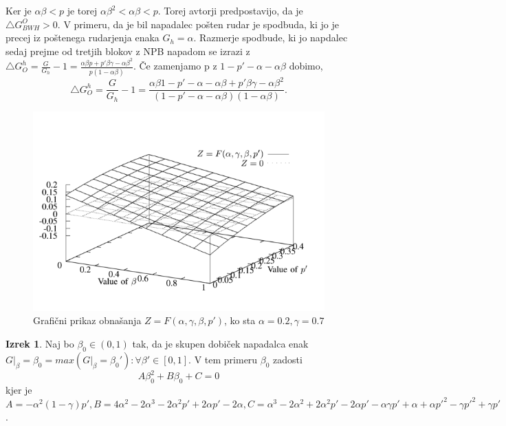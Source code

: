 \documentclass[12pt]{article}
\begin{document}
Ker je $ \alpha\beta < p $ je torej $ \alpha\beta^2 < \alpha\beta < p $. Torej avtorji predpostavijo, da je $ \bigtriangleup G_{BWH}^O > 0.$ V primeru, da je bil napadalec pošten rudar je spodbuda, ki jo je precej iz poštenega rudarjenja enaka $G_h = \alpha$. Razmerje spodbude, ki jo napdalec sedaj prejme od tretjih blokov z NPB napadom se izrazi z $\bigtriangleup G_O^h = \frac{G}{G_h} - 1 = \frac{\alpha\beta p + p' \beta\gamma - \alpha\beta^2}{p(1 - \alpha\beta)}$. Če zamenjamo p z $ 1 - p' - \alpha - \alpha\beta$ dobimo,
\begin{equation} \label{eq:4}
\bigtriangleup G_O^h = \frac{G}{G_h} - 1 = \frac{\alpha\beta 1 - p' - \alpha - \alpha\beta + p' \beta\gamma - \alpha\beta^2}{(1 - p' - \alpha - \alpha\beta)(1 - \alpha\beta)}.
\end{equation}
\newline
\begin{figure}
  \includegraphics[scale=0.5]{image1.png}
  \caption{Grafični prikaz obnašanja $Z = F(\alpha, \gamma, \beta, p')$, ko sta $\alpha = 0.2, \gamma = 0.7$}
  \label{fig:boat1}
\end{figure}
\newline
\textbf{Izrek 1}. Naj bo $ \beta_0 \in (0, 1) $ tak, da je skupen dobiček napadalca enak $G|_\beta=\beta_0 = max(G|_\beta=\beta_0'): \forall\beta' \in [0,1]$. V tem primeru $\beta_0$ zadosti
\begin{equation}
A \beta_0^2 + B\beta_0 + C = 0
\end{equation}
kjer je $A = -\alpha^2(1 - \gamma)p', B = 4\alpha^2 - 2\alpha^3 - 2\alpha^2p' + 2\alpha p' - 2\alpha, C = \alpha^3 - 2\alpha^2 + 2\alpha^2 p' - 2\alpha p' - \alpha\gamma p' + \alpha + \alpha p'^2 - \gamma p'^2 + \gamma p' $.
\end{document}
